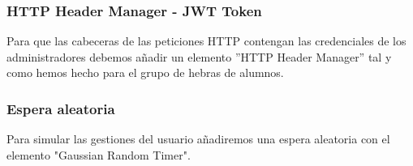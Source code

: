 \subsubsection{HTTP Header Manager - JWT Token}
Para que las cabeceras de las peticiones HTTP contengan las credenciales de los administradores debemos añadir un elemento ''HTTP Header Manager'' tal y como hemos hecho para el
grupo de hebras de alumnos.

\subsubsection{Espera aleatoria}
Para simular las gestiones del usuario añadiremos una espera aleatoria con el elemento "Gaussian Random Timer".

\newpage

\begin{thebibliography}{0}
    \bibitem{} \href{}{}
\end{thebibliography}


